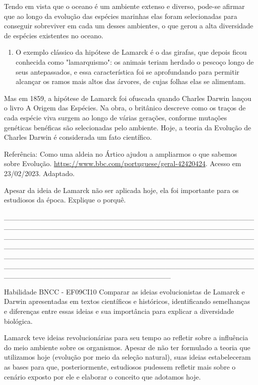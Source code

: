 Tendo em vista que o oceano é um ambiente extenso e diverso, pode-se
afirmar que ao longo da evolução das espécies marinhas elas foram
selecionadas para conseguir sobreviver em cada um desses ambientes, o
que gerou a alta diversidade de espécies existentes no oceano.

\begin{enumerate}
\def\labelenumi{\arabic{enumi}.}
\item
  O exemplo clássico da hipótese de Lamarck é o das girafas, que depois
  ficou conhecida como "lamarquismo": os animais teriam herdado o
  pescoço longo de seus antepassados, e essa característica foi se
  aprofundando para permitir alcançar os ramos mais altos das árvores,
  de cujas folhas elas se alimentam.
\end{enumerate}

Mas em 1859, a hipótese de Lamarck foi ofuscada quando Charles Darwin
lançou o livro A Origem das Espécies. Na obra, o britânico descreve como
os traços de cada espécie viva surgem ao longo de várias gerações,
conforme mutações genéticas benéficas são selecionadas pelo ambiente.
Hoje, a teoria da Evolução de Charles Darwin é considerada um fato
científico.

Referência: Como uma aldeia no Ártico ajudou a ampliarmos o que sabemos
sobre Evolução. \url{https://www.bbc.com/portuguese/geral-42420424}.
Acesso em 23/02/2023. Adaptado.

Apesar da ideia de Lamarck não ser aplicada hoje, ela foi importante
para os estudiosos da época. Explique o porquê.

\_\_\_\_\_\_\_\_\_\_\_\_\_\_\_\_\_\_\_\_\_\_\_\_\_\_\_\_\_\_\_\_\_\_\_\_\_\_\_\_\_\_\_\_\_\_\_\_\_\_\_\_\_\_\_\_\_\_\_\_\_\_\_\_\_\_\_\_\_\_\_\_\_\_\_\_\_\_\_\_\_\_\_\_\_\_\_\_\_\_\_\_\_\_\_\_\_\_\_\_\_\_\_\_\_\_\_\_\_\_\_\_\_\_\_\_\_\_\_\_\_\_\_\_\_\_\_\_\_\_\_\_\_\_\_\_\_\_\_\_\_\_\_\_\_\_\_\_\_\_\_\_\_\_\_\_\_\_\_\_\_\_\_\_\_\_\_\_\_\_\_\_\_\_\_\_\_\_\_\_\_\_\_\_\_\_\_\_\_\_\_\_\_\_\_\_\_\_\_\_\_\_\_\_\_\_\_\_\_\_\_\_\_\_\_\_\_\_\_\_\_\_\_\_\_\_\_\_\_\_\_\_\_\_\_\_\_\_\_\_\_\_\_\_\_\_\_\_\_\_\_\_\_\_\_\_\_\_\_\_\_\_\_\_\_\_\_\_\_\_\_\_\_\_\_\_\_\_\_\_\_\_\_\_\_\_\_\_\_\_\_\_\_\_\_\_\_\_\_\_\_\_\_\_\_\_\_\_\_\_\_\_\_\_\_\_\_\_\_\_

Habilidade BNCC - EF09CI10 Comparar as ideias evolucionistas de Lamarck
e Darwin apresentadas em textos científicos e históricos, identificando
semelhanças e diferenças entre essas ideias e sua importância para
explicar a diversidade biológica.

Lamarck teve ideias revolucionárias para seu tempo ao refletir sobre a
influência do meio ambiente sobre os organismos. Apesar de não ter
formulado a teoria que utilizamos hoje (evolução por meio da seleção
natural), suas ideias estabeleceram as bases para que, posteriormente,
estudiosos pudessem refletir mais sobre o cenário exposto por ele e
elaborar o conceito que adotamos hoje.

